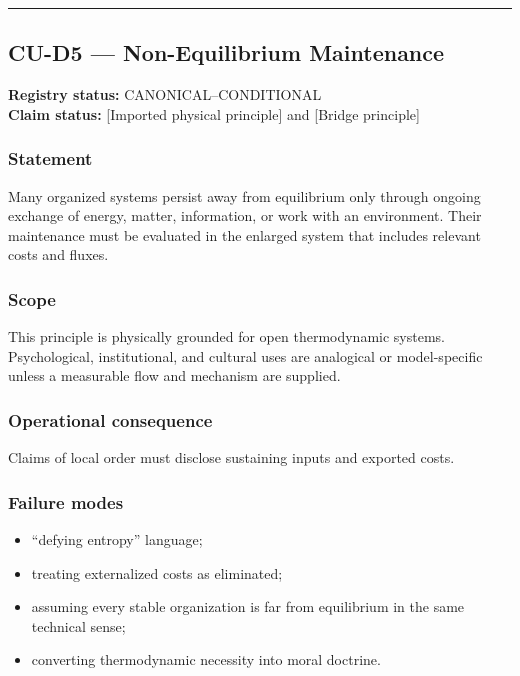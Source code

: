 \documentclass[
  11pt,
]{article}
\providecommand{\tightlist}{%
  \setlength{\itemsep}{0pt}\setlength{\parskip}{0pt}}
\begin{document}
\begin{center}\rule{0.5\linewidth}{0.5pt}\end{center}

\subsection{CU-D5 --- Non-Equilibrium
Maintenance}\label{cu-d5-non-equilibrium-maintenance}

\textbf{Registry status:} CANONICAL--CONDITIONAL\\
\textbf{Claim status:} {[}Imported physical principle{]} and {[}Bridge
principle{]}

\subsubsection{Statement}\label{statement-45}

Many organized systems persist away from equilibrium only through
ongoing exchange of energy, matter, information, or work with an
environment. Their maintenance must be evaluated in the enlarged system
that includes relevant costs and fluxes.

\subsubsection{Scope}\label{scope-19}

This principle is physically grounded for open thermodynamic systems.
Psychological, institutional, and cultural uses are analogical or
model-specific unless a measurable flow and mechanism are supplied.

\subsubsection{Operational
consequence}\label{operational-consequence-27}

Claims of local order must disclose sustaining inputs and exported
costs.

\subsubsection{Failure modes}\label{failure-modes-18}

\begin{itemize}
\tightlist
\item
  ``defying entropy'' language;
\item
  treating externalized costs as eliminated;
\item
  assuming every stable organization is far from equilibrium in the same
  technical sense;
\item
  converting thermodynamic necessity into moral doctrine.
\end{itemize}
\end{document}
